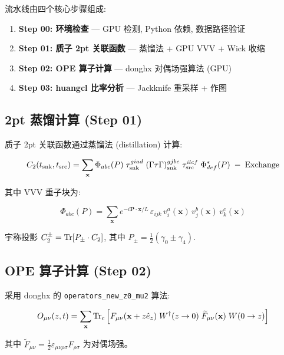 \documentclass[12pt,a4paper]{ctexart}
\begin{document}
流水线由四个核心步骤组成:

\begin{enumerate}[leftmargin=*]
  \item \textbf{Step 00: 环境检查} — GPU 检测, Python 依赖, 数据路径验证
  \item \textbf{Step 01: 质子 2pt 关联函数} — 蒸馏法 + GPU VVV + Wick 收缩
  \item \textbf{Step 02: OPE 算子计算} — donghx 对偶场强算法 (GPU)
  \item \textbf{Step 03: huangcl 比率分析} — Jackknife 重采样 + 作图
\end{enumerate}

\subsection{2pt 蒸馏计算 (Step 01)}

质子 2pt 关联函数通过蒸馏法 (distillation) 计算:

\begin{equation}
  C_2(t_{\rm snk}, t_{\rm src}) = \sum_{\mathbf{x}}
  \Phi_{abc}(P) \; \tau^{giad}_{\rm snk} \;
  (\Gamma\tau\Gamma)^{gjbe}_{\rm snk} \;
  \tau^{ilcf}_{\rm src} \; \Phi^*_{def}(P)
  \;-\; \text{Exchange}
\end{equation}

其中 VVV 重子块为:

\begin{equation}
  \Phi_{abc}(P) = \sum_{\mathbf{x}} e^{-i\mathbf{P}\cdot\mathbf{x}/L}
  \, \varepsilon_{ijk} \, v_i^a(\mathbf{x}) \, v_j^b(\mathbf{x}) \, v_k^c(\mathbf{x})
\end{equation}

宇称投影 $C_2^{\pm} = \Tr[P_{\pm} \cdot C_2]$, 其中 $P_{\pm} = \tfrac12 (\gamma_0 \pm \gamma_4)$.

\subsection{OPE 算子计算 (Step 02)}

采用 donghx 的 \texttt{operators\_new\_z0\_mu2} 算法:

\begin{equation}
  O_{\mu\nu}(z, t) = \sum_{\mathbf{x}}
  \Tr_c\left[
    F_{\mu\nu}(\mathbf{x}+z\hat{e}_z) \;
    W^\dagger(z\to 0) \;
    \widetilde{F}_{\mu\nu}(\mathbf{x}) \;
    W(0\to z)
  \right]
\end{equation}

其中 $\widetilde{F}_{\mu\nu} = \frac12 \varepsilon_{\mu\nu\rho\sigma} F_{\rho\sigma}$ 为对偶场强。
\end{document}
